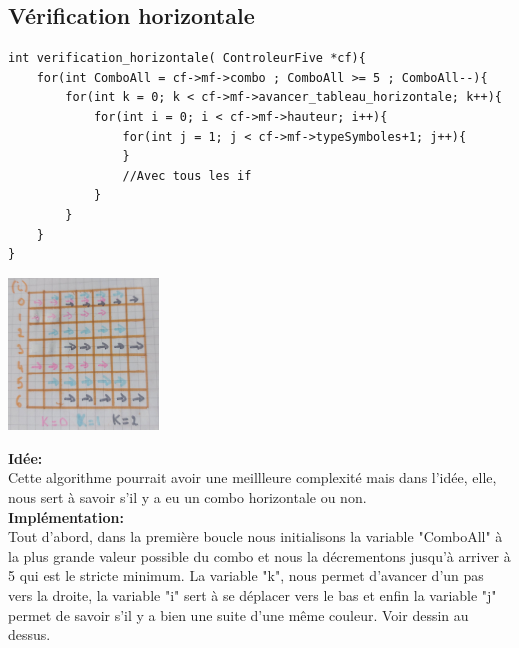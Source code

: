 \documentclass[a4paper, 11pt, oneside]{article}
\begin{document}
\subsection{Vérification horizontale}
\begin{lstlisting}
int verification_horizontale( ControleurFive *cf){
    for(int ComboAll = cf->mf->combo ; ComboAll >= 5 ; ComboAll--){
        for(int k = 0; k < cf->mf->avancer_tableau_horizontale; k++){
            for(int i = 0; i < cf->mf->hauteur; i++){
                for(int j = 1; j < cf->mf->typeSymboles+1; j++){
                }
                //Avec tous les if
            }
        }
    }
}
\end{lstlisting}
\begin{center}
    \includegraphics[width=4cm]{./images/horizontale.jpg}\\ 
\end{center} 


\textbf{Idée:}\\
    Cette algorithme pourrait avoir une meillleure complexité mais dans l'idée, elle, nous sert à savoir s'il y a eu un combo horizontale ou non.
\\
\textbf{Implémentation:}\\
Tout d'abord, dans la première boucle nous initialisons la variable "ComboAll" à la plus grande valeur possible du combo et nous la décrementons jusqu'à arriver à 5 qui est le stricte minimum.
La variable "k", nous permet d'avancer d'un pas vers la droite, la variable "i" sert à se déplacer vers le bas et enfin la variable "j" permet de savoir s'il y a bien une suite d'une même couleur.
Voir dessin au dessus.
\newpage
\end{document}
